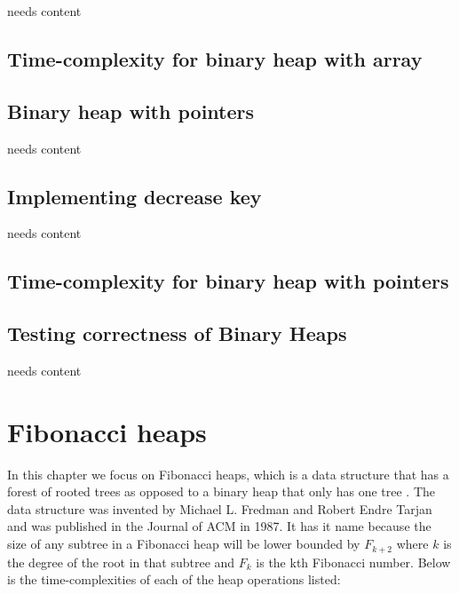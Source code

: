 \documentclass[oneside,11pt,openright]{report}
\begin{document}
needs content

\section{Time-complexity for binary heap with array}

\section{Binary heap with pointers}

needs content

\section{Implementing decrease key}

needs content

\section{Time-complexity for binary heap with pointers}

\section{Testing correctness of Binary Heaps}

needs content

\chapter{Fibonacci heaps}

In this chapter we focus on Fibonacci heaps, which is a data structure that has a forest of rooted trees as opposed to a binary heap that only has one tree \cite{FT87}. The data structure was invented by Michael L. Fredman and Robert Endre Tarjan and was published in the Journal of ACM in 1987. It has it name because the size of any subtree in a Fibonacci heap will be lower bounded by $F_{k+2}$ where $k$ is the degree of the root in that subtree and $F_k$ is the kth Fibonacci number. Below is the time-complexities of each of the heap operations listed:
\end{document}

